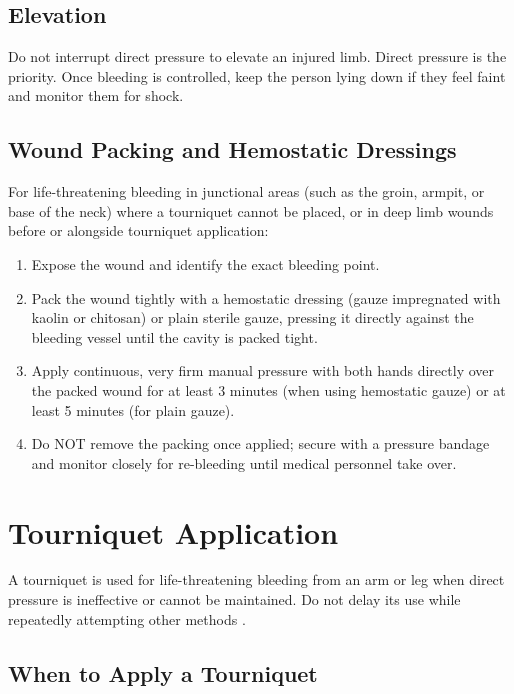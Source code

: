 \subsection{Elevation}

Do not interrupt direct pressure to elevate an injured limb. Direct pressure is
the priority. Once bleeding is controlled, keep the person lying down if they
feel faint and monitor them for shock.

\subsection{Wound Packing and Hemostatic Dressings}

For life-threatening bleeding in junctional areas (such as the groin, armpit, or base of the neck) where a tourniquet cannot be placed, or in deep limb wounds before or alongside tourniquet application:

\begin{enumerate}[leftmargin=*]
\item Expose the wound and identify the exact bleeding point.
\item Pack the wound tightly with a hemostatic dressing (gauze impregnated with kaolin or chitosan) or plain sterile gauze, pressing it directly against the bleeding vessel until the cavity is packed tight.
\item Apply continuous, very firm manual pressure with both hands directly over the packed wound for at least 3 minutes (when using hemostatic gauze) or at least 5 minutes (for plain gauze).
\item Do NOT remove the packing once applied; secure with a pressure bandage and monitor closely for re-bleeding until medical personnel take over.
\end{enumerate}

\section{Tourniquet Application}

A tourniquet is used for life-threatening bleeding from an arm or leg when
direct pressure is ineffective or cannot be maintained. Do not delay its use
while repeatedly attempting other methods \cite{aha_arc_2024}.

\subsection{When to Apply a Tourniquet}

